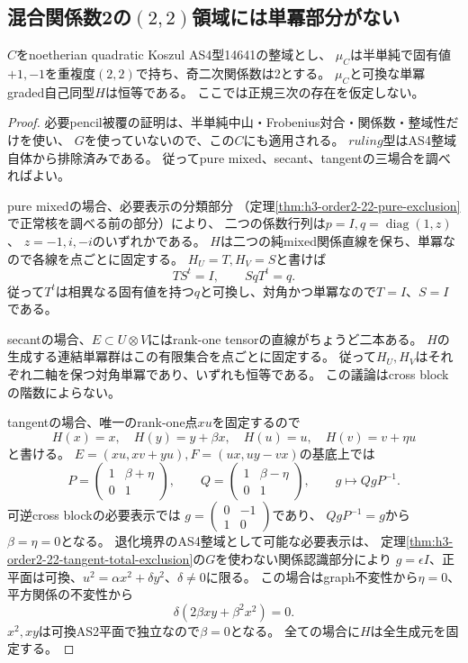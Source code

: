 \subsection{混合関係数2の$(2,2)$領域には単冪部分がない}
\label{subsec:h3-order2-22-rank2-unipotent}
\begin{lemma}\label{lem:h3-order2-22-rank2-unipotent-rigidity}
$C$をnoetherian quadratic Koszul AS4型14641の整域とし、
$\mu_C$は半単純で固有値$+1,-1$を重複度$(2,2)$で持ち、奇二次関係数は2とする。
$\mu_C$と可換な単冪graded自己同型$H$は恒等である。
ここでは正規三次の存在を仮定しない。
\end{lemma}
\begin{proof}
必要pencil被覆の証明は、半単純中山・Frobenius対合・関係数・整域性だけを使い、
$G$を使っていないので、この$C$にも適用される。
$ruling$型はAS4整域自体から排除済みである。
従ってpure mixed、secant、tangentの三場合を調べればよい。

pure mixedの場合、必要表示の分類部分
（定理\ref{thm:h3-order2-22-pure-exclusion}で正常核を調べる前の部分）により、
二つの係数行列は$p=I,q=\operatorname{diag}(1,z)$、
$z=-1,i,-i$のいずれかである。
$H$は二つの純mixed関係直線を保ち、単冪なので各線を点ごとに固定する。
$H_U=T,H_V=S$と書けば
\[
 TS^t=I,\qquad SqT^t=q.
\]
従って$T^t$は相異なる固有値を持つ$q$と可換し、対角かつ単冪なので$T=I$、$S=I$である。

secantの場合、$E\subset U\otimes V$にはrank-one tensorの直線がちょうど二本ある。
$H$の生成する連結単冪群はこの有限集合を点ごとに固定する。
従って$H_U,H_V$はそれぞれ二軸を保つ対角単冪であり、いずれも恒等である。
この議論はcross blockの階数によらない。

tangentの場合、唯一のrank-one点$xu$を固定するので
\[
 H(x)=x,\quad H(y)=y+\beta x,\quad
 H(u)=u,\quad H(v)=v+\eta u
\]
と書ける。
$E=(xu,xv+yu),F=(ux,uy-vx)$の基底上では
\[
 P=\begin{pmatrix}1&\beta+\eta\\0&1\end{pmatrix},\qquad
 Q=\begin{pmatrix}1&\beta-\eta\\0&1\end{pmatrix},\qquad
 g\longmapsto QgP^{-1}.
\]
可逆cross blockの必要表示では
$g=\left(\begin{smallmatrix}0&-1\\1&0\end{smallmatrix}\right)$であり、
$QgP^{-1}=g$から$\beta=\eta=0$となる。
退化境界のAS4整域として可能な必要表示は、
定理\ref{thm:h3-order2-22-tangent-total-exclusion}の$G$を使わない関係認識部分により
$g=\epsilon I$、正平面は可換、$u^2=\alpha x^2+\delta y^2$、$\delta\ne0$に限る。
この場合はgraph不変性から$\eta=0$、平方関係の不変性から
\[
 \delta(2\beta xy+\beta^2x^2)=0.
\]
$x^2,xy$は可換AS2平面で独立なので$\beta=0$となる。
全ての場合に$H$は全生成元を固定する。
\end{proof}

